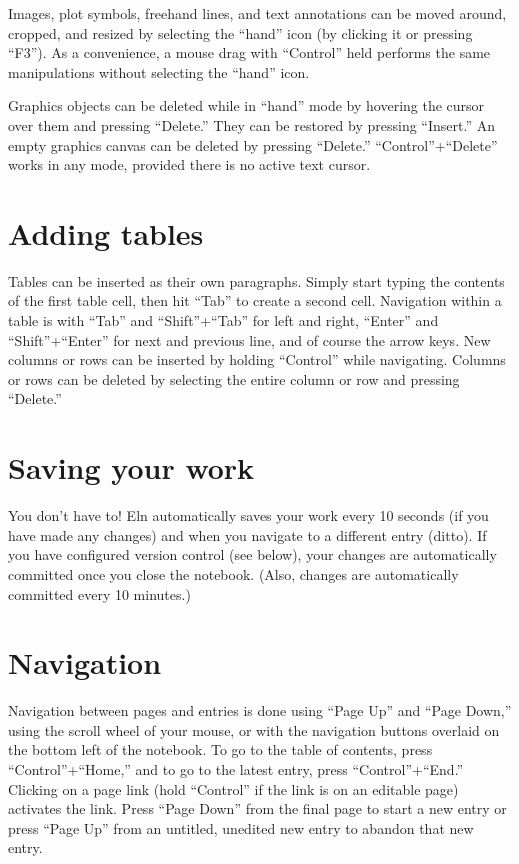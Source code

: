 \documentclass[11pt]{report}
\begin{document}
Images, plot symbols, freehand lines, and text annotations can be
moved around, cropped, and resized by selecting the ``hand'' icon (by
clicking it or pressing ``F3''). As a convenience, a mouse drag with
``Control'' held performs the same manipulations without selecting the
``hand'' icon.

Graphics objects can be deleted while in ``hand'' mode by hovering the
cursor over them and pressing ``Delete.'' They can be restored by
pressing ``Insert.'' An empty graphics canvas can be deleted by
pressing ``Delete.'' ``Control''+``Delete'' works in any mode,
provided there is no active text cursor.

\section{Adding tables}

Tables can be inserted as their own paragraphs. Simply start typing
the contents of the first table cell, then hit ``Tab'' to create a
second cell. Navigation within a table is with ``Tab'' and
``Shift''+``Tab'' for left and right, ``Enter'' and
``Shift''+``Enter'' for next and previous line, and of course the
arrow keys. New columns or rows can be inserted by holding ``Control''
while navigating. Columns or rows can be deleted by selecting the
entire column or row and pressing ``Delete.''

\section{Saving your work}

You don't have to! Eln automatically saves your work every 10 seconds
(if you have made any changes) and when you navigate to a different
entry (ditto). If you have configured version control (see below),
your changes are automatically committed once you close the
notebook. (Also, changes are automatically committed every 10
minutes.)

\section{Navigation}

Navigation between pages and entries is done using ``Page Up'' and
``Page Down,'' using the scroll wheel of your mouse, or with the
navigation buttons overlaid on the bottom left of the notebook. To go
to the table of contents, press ``Control''+``Home,'' and to go to the
latest entry, press ``Control''+``End.'' Clicking on a page link (hold
``Control'' if the link is on an editable page) activates the
link. Press ``Page Down'' from the final page to start a new entry or
press ``Page Up'' from an untitled, unedited new entry to abandon that
new entry.
\end{document}

